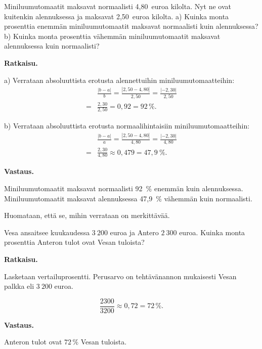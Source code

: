 \begin{esimerkki}
    Miniluumutomaatit maksavat normaalisti 4,80~euroa kilolta. Nyt ne ovat kuitenkin alennuksessa ja maksavat 2,50~euroa kilolta.
     \newline a) Kuinka monta prosenttia enemmän miniluumutomaatit maksavat normaalisti kuin alennuksessa?
     \newline b) Kuinka monta prosenttia vähemmän miniluumutomaatit maksavat alennuksessa kuin normaalisti?
     
     \textbf{Ratkaisu.}
     
a) Verrataan absoluuttista erotusta alennettuihin miniluumutomaatteihin:
\begin{align*}
     &\frac{|b-a|}{b}  = \frac{|2,50-4,80|}{2,50} = \frac{|-2,30|}{2,50} \\
     = &\frac{2,30}{2,50}  = 0,92 = 92\,\%.
\end{align*}
    
    
b) Verrataan absoluuttista erotusta normaalihintaisiin miniluumutomaatteihin:
\begin{align*}
     &\frac{|b-a|}{a} = \frac{|2,50-4,80|}{4,80} = \frac{|-2,30|}{4,80} \\
     = &\frac{2,30}{4,80}  \approx 0,479  = 47,9~\%.
\end{align*}

     \textbf{Vastaus.}
     
     Miniluumutomaatit maksavat normaalisti 92~\% enemmän kuin alennuksessa.
     Miniluumutomaatit maksavat alennuksessa 47,9~\% vähemmän kuin normaalisti.
     
     Huomataan, että se, mihin verrataan on merkittävää.
     \end{esimerkki}
    

\begin{esimerkki}
    Vesa ansaitsee kuukaudessa ${3~200}$ euroa ja Antero ${2~300}$ euroa.
    Kuinka monta prosenttia Anteron tulot ovat Vesan tuloista? 
    
    \textbf{Ratkaisu.}
    
    Lasketaan vertailuprosentti. Perusarvo on tehtävänannon mukaisesti
    Vesan palkka eli ${3~200}$ euroa.
    
    \[
        \frac{2300}{3200} 
        \approx 0,72
        = 72\,\%.
    \]
    
    \textbf{Vastaus.}
    
    Anteron tulot ovat $72\,\%$ Vesan tuloista.
\end{esimerkki}

